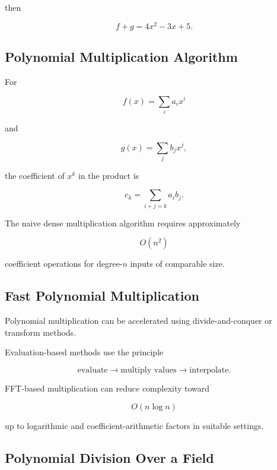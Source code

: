 then

\[
\boxed{
f+g
=
4x^2-3x+5.
}
\]

\subsection{Polynomial Multiplication Algorithm}
\label{subsec:polynomial-multiplication-algorithm}

For

\[
f(x)
=
\sum_i a_ix^i
\]

and

\[
g(x)
=
\sum_j b_jx^j,
\]

the coefficient of \(x^k\) in the product is

\[
\boxed{
c_k
=
\sum_{i+j=k}
a_ib_j.
}
\]

The naive dense multiplication algorithm requires approximately

\[
\boxed{
O(n^2)
}
\]

coefficient operations for degree-\(n\) inputs of comparable size.

\subsection{Fast Polynomial Multiplication}
\label{subsec:fast-polynomial-multiplication}

Polynomial multiplication can be accelerated using divide-and-conquer or
transform methods.

Evaluation-based methods use the principle

\[
\boxed{
\text{evaluate}
\rightarrow
\text{multiply values}
\rightarrow
\text{interpolate}.
}
\]

FFT-based multiplication can reduce complexity toward

\[
\boxed{
O(n\log n)
}
\]

up to logarithmic and coefficient-arithmetic factors in suitable settings.

\subsection{Polynomial Division Over a Field}
\label{subsec:polynomial-division-field}

